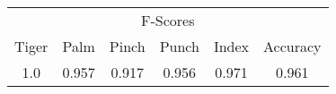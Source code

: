 \documentclass{standalone}
\begin{document}
 
 \begin{tabular}{|c|c|c|c|c ||c|}
\cline{1-6}\multicolumn{6}{|c|}{F-Scores} \\ 
\cline{1-6}Tiger & Palm & Pinch & Punch & Index & Accuracy\\ 
\cline{1-6}1.0 & 0.957 & 0.917 & 0.956 & 0.971 & 0.961\\ 
 \cline{1-6}\hline \end{tabular}
 
\end{document}
